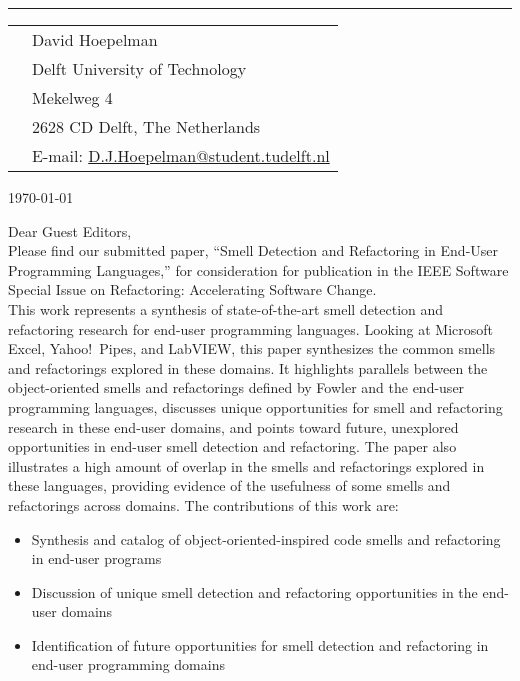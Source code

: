 \documentclass[9pt]{article}
\newcommand{\HRule}{\rule{\columnwidth}{0.25mm}}
\begin{document}
\vspace{-6pt}
\HRule

\vspace{20pt}

\begin{tabular}{p{3.90in}l}
&David Hoepelman\\
&Delft University of Technology\\
&Mekelweg 4\\
&2628 CD Delft, The Netherlands\\
& E-mail: \href{mailto:D.J.Hoepelman@student.tudelft.nl}{D.J.Hoepelman@student.tudelft.nl}\\
\end{tabular}

\vspace{20pt}

\begin{flushright}
\today
\end{flushright}

\vspace{20pt}

\noindent Dear Guest Editors,\\

\noindent Please find our submitted paper, ``Smell Detection and Refactoring in End-User Programming Languages,'' for consideration for publication in the IEEE Software Special Issue on Refactoring: Accelerating Software Change. \\

\noindent This work represents a synthesis of state-of-the-art smell detection and refactoring research for end-user programming languages. 
Looking at Microsoft Excel, Yahoo!\ Pipes, and LabVIEW, this paper synthesizes the common smells and refactorings explored in these domains.
It highlights parallels between the object-oriented smells and refactorings defined by Fowler and the end-user programming languages, discusses unique opportunities for smell and refactoring research in these end-user domains, and points toward future, unexplored opportunities in end-user smell detection and refactoring.
The paper also illustrates a high amount of overlap in the smells and refactorings explored in these languages, providing evidence of the usefulness of some smells and refactorings across domains.
The contributions of this work are:

\begin{itemize}
	\item Synthesis and catalog of object-oriented-inspired code smells  and refactoring in end-user programs
	\item Discussion of unique smell detection and refactoring opportunities in the end-user domains 
	\item Identification of future opportunities for smell detection and refactoring in end-user programming domains
\end{itemize}
\end{document}
